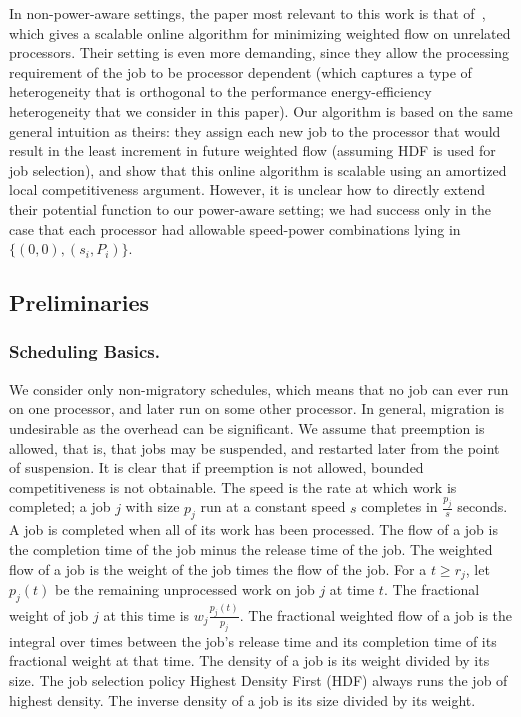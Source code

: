 \documentclass[11pt]{article}
\begin{document}
In non-power-aware settings, the paper most relevant to this work is
that of~\cite{Chadha2009}, which gives a scalable online algorithm for
minimizing weighted flow on unrelated processors. Their setting is even
more demanding, since they allow the processing requirement of the job
to be processor dependent (which captures a type of heterogeneity that
is orthogonal to the performance energy-efficiency heterogeneity that we
consider in this paper). Our algorithm is based on the same general
intuition as theirs: they assign each new job to the processor that
would result in the least increment in future weighted flow (assuming
HDF is used for job selection), and show that this online algorithm is
scalable using an amortized local competitiveness argument.  However, it
is unclear how to directly extend their potential function to our
power-aware setting; we  had success only in the case that each processor
had allowable speed-power combinations lying in $\{(0,0), (s_i, P_i)\}$.





\subsection{Preliminaries}
\label{sec:preliminaries}

\subsubsection{Scheduling Basics.}
We consider only non-migratory schedules, which means that no job can
ever run on one processor, and later run on some other processor. In
general, migration is undesirable as the overhead can be significant. We
assume that preemption is allowed, that is, that jobs may be suspended,
and restarted later from the point of suspension.  It is clear that if
preemption is not allowed, bounded competitiveness is not
obtainable.  The speed is the rate at which work is completed; a job $j$
with size $p_j$ run at a constant speed $s$ completes in $\frac{p_j}{s}$
seconds. A job is completed when all of its work has been  processed.
The flow of a job is the completion time of the job minus the release time of the job.
The weighted flow of a job is the weight of the job times the flow of the job.
For a $t \ge r_j$, let $p_j(t)$ be the remaining unprocessed
work on job $j$ at time $t$. The  fractional weight of job $j$ at this
time is $w_j \frac{p_j(t)}{p_j}$.
The fractional weighted flow of a job is the integral over times
between the job's release time
and its completion time of its fractional weight at that time.
The density of a job is its weight divided by its size.
The job selection policy Highest Density First (HDF) always runs the job of highest density.
The inverse density of a job is its size divided by its weight.
\end{document}

